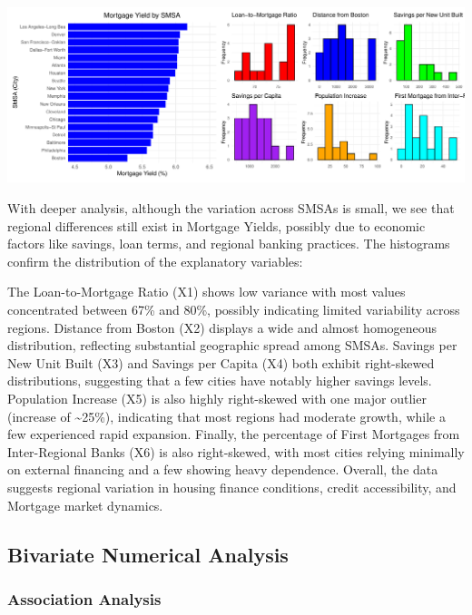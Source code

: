 \documentclass[
  11pt,
]{article}
\begin{document}
\includegraphics{Figs/unnamed-chunk-4-1.pdf}

With deeper analysis, although the variation across SMSAs is small, we
see that regional differences still exist in Mortgage Yields, possibly
due to economic factors like savings, loan terms, and regional banking
practices. The histograms confirm the distribution of the explanatory
variables:

The Loan-to-Mortgage Ratio (X1) shows low variance with most values
concentrated between 67\% and 80\%, possibly indicating limited
variability across regions. Distance from Boston (X2) displays a wide
and almost homogeneous distribution, reflecting substantial geographic
spread among SMSAs. Savings per New Unit Built (X3) and Savings per
Capita (X4) both exhibit right-skewed distributions, suggesting that a
few cities have notably higher savings levels. Population Increase (X5)
is also highly right-skewed with one major outlier (increase of
\textasciitilde25\%), indicating that most regions had moderate growth,
while a few experienced rapid expansion. Finally, the percentage of
First Mortgages from Inter-Regional Banks (X6) is also right-skewed,
with most cities relying minimally on external financing and a few
showing heavy dependence. Overall, the data suggests regional variation
in housing finance conditions, credit accessibility, and Mortgage market
dynamics.

\subsection{Bivariate Numerical
Analysis}\label{bivariate-numerical-analysis}

\subsubsection{Association Analysis}\label{association-analysis}
\end{document}
